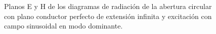\begin{figure} [H]
\centering 
{}
\hspace{5mm}
\caption{Planos E y H de los diagramas de radiación de la abertura circular con plano conductor perfecto de extensión infinita y excitación con campo sinusoidal en modo dominante.}
\label{grup_fig_estudio:4}
\end{figure}
